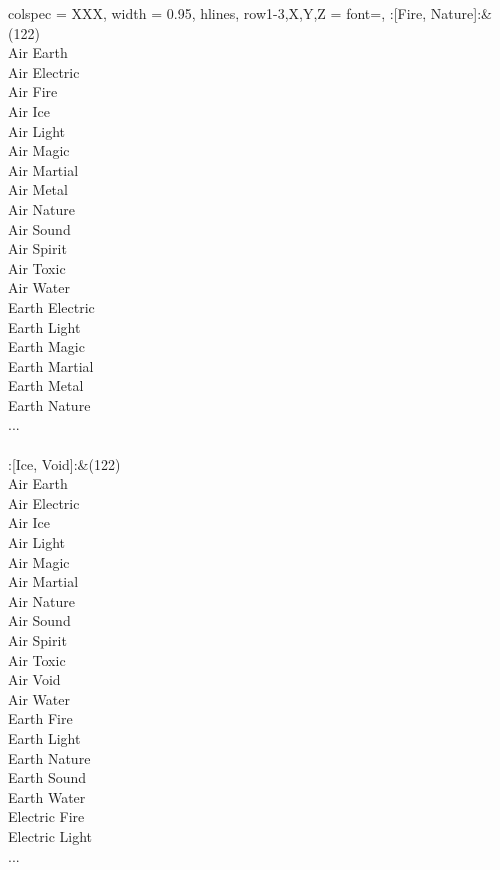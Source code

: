 \begin{longtblr}[
	caption = {2v2 Defending Weak},
	label = {2v2-Defending-Weak},
]{
	colspec = {XXX}, width = 0.95\linewidth,
	hlines,
	row{1-3,X,Y,Z} = {font=\bfseries},
}
	:[Fire, Nature]:&{(122)\\
	Air Earth \\
	Air Electric \\
	Air Fire \\
	Air Ice \\
	Air Light \\
	Air Magic \\
	Air Martial \\
	Air Metal \\
	Air Nature \\
	Air Sound \\
	Air Spirit \\
	Air Toxic \\
	Air Water \\
	Earth Electric \\
	Earth Light \\
	Earth Magic \\
	Earth Martial \\
	Earth Metal \\
	Earth Nature \\
	...\\
	}\\

	:[Ice, Void]:&{(122)\\
	Air Earth \\
	Air Electric \\
	Air Ice \\
	Air Light \\
	Air Magic \\
	Air Martial \\
	Air Nature \\
	Air Sound \\
	Air Spirit \\
	Air Toxic \\
	Air Void \\
	Air Water \\
	Earth Fire \\
	Earth Light \\
	Earth Nature \\
	Earth Sound \\
	Earth Water \\
	Electric Fire \\
	Electric Light \\
	...\\
	}\\


\end{longtblr}

